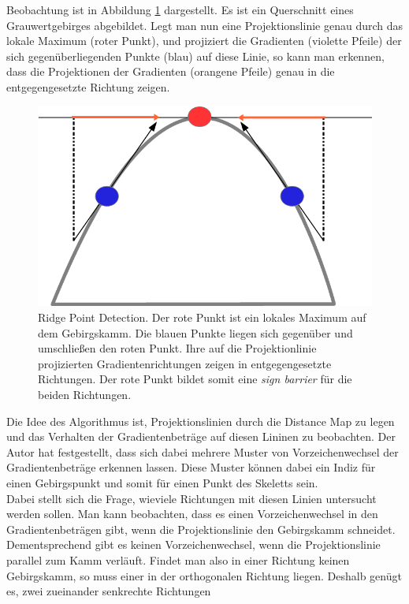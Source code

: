 Beobachtung ist in Abbildung \ref{fig:paper_ridge_point_detection} dargestellt. Es ist ein Querschnitt eines Grauwertgebirges
abgebildet. Legt man nun eine Projektionslinie genau durch das lokale Maximum (roter Punkt), und projiziert die Gradienten (violette Pfeile) der sich gegenüberliegenden Punkte (blau) auf diese Linie, so kann man erkennen, dass die Projektionen der Gradienten (orangene Pfeile) genau in die entgegengesetzte Richtung zeigen.\
\begin{figure}
\centering
\includegraphics[width=1.0\linewidth]{./fig/paper_ridge_point_detection.png}
\caption{Ridge Point Detection. Der rote Punkt ist ein lokales Maximum auf dem Gebirgskamm. Die blauen Punkte liegen sich
gegenüber und umschließen den roten Punkt. Ihre auf die Projektionlinie projizierten Gradientenrichtungen zeigen in entgegengesetzte Richtungen. Der rote Punkt bildet somit eine \emph{sign barrier} für die beiden Richtungen.}
\label{fig:paper_ridge_point_detection}
\end{figure}
Die Idee des Algorithmus ist, Projektionslinien durch die Distance Map zu legen und das Verhalten der Gradientenbeträge
auf diesen Lininen zu beobachten. Der Autor hat festgestellt, dass sich dabei mehrere Muster von Vorzeichenwechsel der
Gradientenbeträge erkennen lassen. Diese Muster können dabei ein Indiz für einen Gebirgspunkt und somit für einen Punkt des Skeletts sein. \\
Dabei stellt sich die Frage, wieviele Richtungen mit diesen Linien untersucht werden sollen. Man kann beobachten, dass es
einen Vorzeichenwechsel in den Gradientenbeträgen gibt, wenn die Projektionslinie den Gebirgskamm schneidet. Dementsprechend 
gibt es keinen Vorzeichenwechsel, wenn die Projektionslinie parallel zum Kamm verläuft. Findet man also in einer Richtung
keinen Gebirgskamm, so muss einer in der orthogonalen Richtung liegen. Deshalb genügt es, zwei zueinander senkrechte Richtungen
